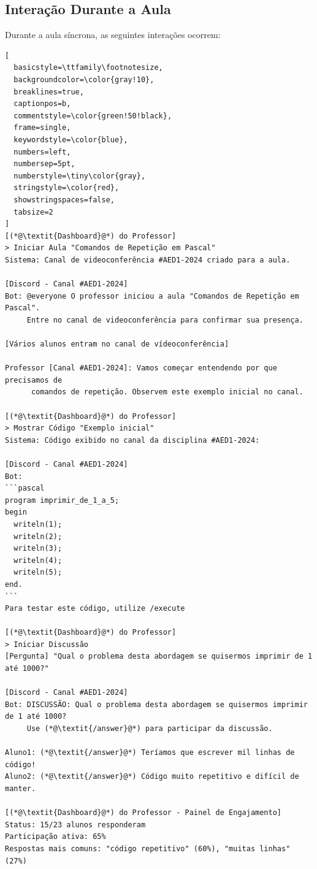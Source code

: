 \subsection{Interação Durante a Aula}
\label{subsec:interacao}

Durante a aula síncrona, as seguintes interações ocorrem:

\begin{lstlisting}[
  basicstyle=\ttfamily\footnotesize,
  backgroundcolor=\color{gray!10},
  breaklines=true,
  captionpos=b,
  commentstyle=\color{green!50!black},
  frame=single,
  keywordstyle=\color{blue},
  numbers=left,
  numbersep=5pt,
  numberstyle=\tiny\color{gray},
  stringstyle=\color{red},
  showstringspaces=false,
  tabsize=2
]
[(*@\textit{Dashboard}@*) do Professor]
> Iniciar Aula "Comandos de Repetição em Pascal"
Sistema: Canal de videoconferência #AED1-2024 criado para a aula.

[Discord - Canal #AED1-2024]
Bot: @everyone O professor iniciou a aula "Comandos de Repetição em Pascal". 
     Entre no canal de videoconferência para confirmar sua presença.

[Vários alunos entram no canal de vídeoconferência]

Professor [Canal #AED1-2024]: Vamos começar entendendo por que precisamos de
      comandos de repetição. Observem este exemplo inicial no canal.

[(*@\textit{Dashboard}@*) do Professor]
> Mostrar Código "Exemplo inicial"
Sistema: Código exibido no canal da disciplina #AED1-2024:

[Discord - Canal #AED1-2024]
Bot: 
```pascal
program imprimir_de_1_a_5;
begin
  writeln(1);
  writeln(2);
  writeln(3);
  writeln(4);
  writeln(5);
end.
```
Para testar este código, utilize /execute

[(*@\textit{Dashboard}@*) do Professor]
> Iniciar Discussão
[Pergunta] "Qual o problema desta abordagem se quisermos imprimir de 1 até 1000?"

[Discord - Canal #AED1-2024]
Bot: DISCUSSÃO: Qual o problema desta abordagem se quisermos imprimir de 1 até 1000?
     Use (*@\textit{/answer}@*) para participar da discussão.

Aluno1: (*@\textit{/answer}@*) Teríamos que escrever mil linhas de código!
Aluno2: (*@\textit{/answer}@*) Código muito repetitivo e difícil de manter.

[(*@\textit{Dashboard}@*) do Professor - Painel de Engajamento]
Status: 15/23 alunos responderam
Participação ativa: 65%
Respostas mais comuns: "código repetitivo" (60%), "muitas linhas" (27%)


\end{lstlisting}
